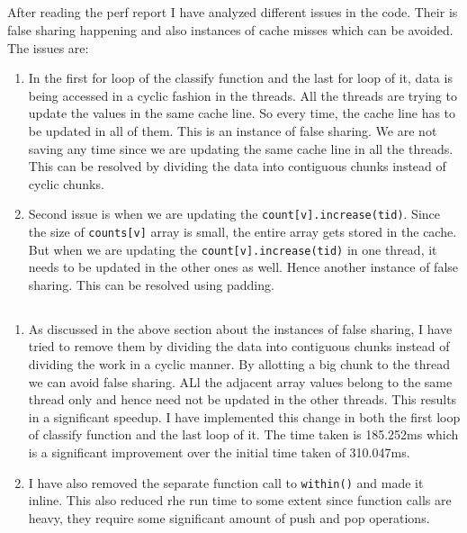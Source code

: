 \documentclass{article}
\begin{document}
\subsection{}
After reading the perf report I have analyzed different issues in the code. Their is false sharing happening and also instances of cache misses which can be avoided. The issues are:

\begin{enumerate}
    \item In the first for loop of the classify function and the last for loop of it, data is being accessed in a cyclic fashion in the threads. All the threads are trying to update the values in the same cache line. So every time, the cache line has to be updated in all of them. This is an instance of false sharing. We are not saving any time since we are updating the same cache line in all the threads. This can be resolved by dividing the data into contiguous chunks instead of cyclic chunks.
    \item Second issue is when we are updating the \texttt{count[v].increase(tid)}. Since the size of \texttt{counts[v]} array is small, the entire array gets stored in the cache. But when we are updating the \texttt{count[v].increase(tid)} in one thread, it needs to be updated in the other ones as well. Hence another instance of false sharing. This can be resolved using padding.
\end{enumerate}

\subsection{}

\begin{enumerate}
    \item As discussed in the above section about the instances of false sharing, I have tried to remove them by dividing the data into contiguous chunks instead of dividing the work in a cyclic manner. By allotting a big chunk to the thread we can avoid false sharing. ALl the adjacent array values belong to the same thread only and hence need not be updated in the other threads. This results in a significant speedup. I have implemented this change in both the first loop of classify function and the last loop of it. The time taken is 185.252ms which is a significant improvement over the initial time taken of 310.047ms.
    \item I have also removed the separate function call to \texttt{within()} and made it inline. This also reduced rhe run time to some extent since function calls are heavy, they require some significant amount of push and pop operations. 
\end{enumerate}
 
\end{document}
